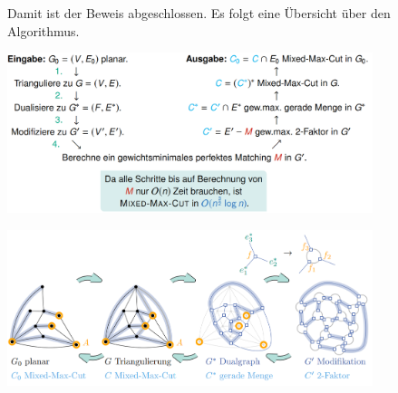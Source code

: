 Damit ist der Beweis abgeschlossen. Es folgt eine Übersicht über den Algorithmus.
\begin{center}
	\includegraphics[width=0.8\textwidth]{images/mmc-9.png}
\end{center}
\begin{center}
	\includegraphics[width=0.8\textwidth]{images/mmc-10.png}
\end{center}